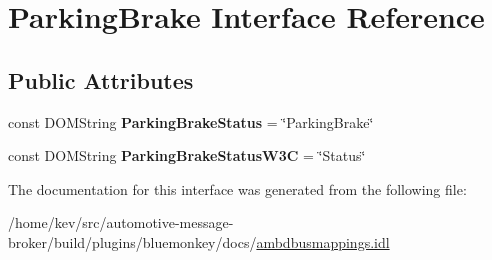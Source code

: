 \hypertarget{interfaceParkingBrake}{\section{Parking\+Brake Interface Reference}
\label{interfaceParkingBrake}
}
\subsection*{Public Attributes}
\begin{DoxyCompactItemize}
\item 
\hypertarget{interfaceParkingBrake_ad3955889a251a4cf6920501d2cc8adea}{const D\+O\+M\+String {\bfseries Parking\+Brake\+Status} = \char`\"{}Parking\+Brake\char`\"{}}\label{interfaceParkingBrake_ad3955889a251a4cf6920501d2cc8adea}

\item 
\hypertarget{interfaceParkingBrake_a549f6509cf0b23bfaae43928fd103da7}{const D\+O\+M\+String {\bfseries Parking\+Brake\+Status\+W3\+C} = \char`\"{}Status\char`\"{}}\label{interfaceParkingBrake_a549f6509cf0b23bfaae43928fd103da7}

\end{DoxyCompactItemize}


The documentation for this interface was generated from the following file\+:\begin{DoxyCompactItemize}
\item 
/home/kev/src/automotive-\/message-\/broker/build/plugins/bluemonkey/docs/\hyperlink{ambdbusmappings_8idl}{ambdbusmappings.\+idl}\end{DoxyCompactItemize}
